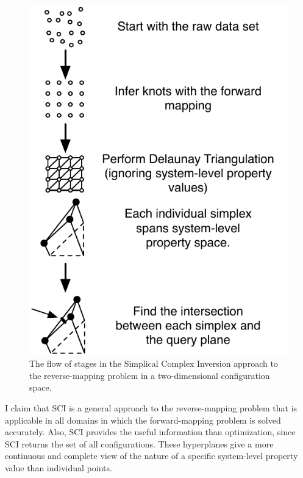 \begin{figure}[ht]
\centering
\includegraphics[scale=1]{images/ISflow.pdf}
\caption{The flow of stages in the Simplical Complex Inversion approach to the reverse-mapping problem in a two-dimensional configuration space.}
\label{fig:ISFlow}
\end{figure}

I claim that SCI is a general approach to the reverse-mapping problem that is applicable in all domains in which the forward-mapping problem is solved accurately.
Also, SCI provides the useful information than optimization, since SCI returns the set of all configurations.
These hyperplanes give a more continuous and complete view of the nature of a specific system-level property value than individual points.




